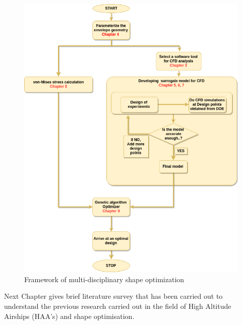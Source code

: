\begin{figure}[H]
	\includegraphics[width=\textwidth]{layout/layout.png} 
	\caption{Framework of multi-disciplinary shape optimization}
	\label{Report layout} %
\end{figure}
Next Chapter gives brief literature survey that has been carried out to understand the previous research carried out in the field of High Altitude Airships (HAA's) and shape optimisation.





